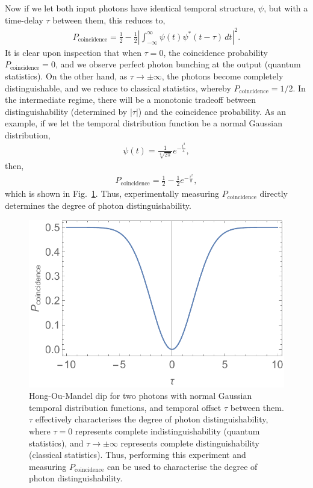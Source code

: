 \documentclass[aps,rmp,twocolumn,amsmath,amssymb,nofootinbib,superscriptaddress,longbibliography,floatfix,table-of-contents,eqsecnum]{revtex4-1}
\begin{document}
Now if we let both input photons have identical temporal structure, $\psi$, but with a time-delay $\tau$ between them, this reduces to,
\begin{align}
P_\text{coincidence} = \frac{1}{2} - \frac{1}{2} \left| \int^\infty_{-\infty} \psi(t)\psi^*(t-\tau)\,dt\right|^2.
\end{align}
It is clear upon inspection that when \mbox{$\tau=0$}, the coincidence probability \mbox{$P_\text{coincidence}=0$}, and we observe perfect photon bunching at the output (quantum statistics). On the other hand, as \mbox{$\tau\to\pm\infty$}, the photons become completely distinguishable, and we reduce to classical statistics, whereby \mbox{$P_\text{coincidence}=1/2$}. In the intermediate regime, there will be a monotonic tradeoff between distinguishability (determined by $|\tau|$) and the coincidence probability. As an example, if we let the temporal distribution function be a normal Gaussian distribution,
\begin{align}
\psi(t) = \frac{1}{\sqrt[4]{2\pi}}e^{-\frac{t^2}{4}},
\end{align}
then,
\begin{align}
P_\text{coincidence} = \frac{1}{2} - \frac{1}{2} e^{-\frac{\tau^2}{8}},
\end{align}
which is shown in Fig.~\ref{fig:HOM_dip}. Thus, experimentally measuring $P_\text{coincidence}$ directly determines the degree of photon distinguishability.

\begin{figure}[!htb]
\includegraphics[width=\columnwidth]{HOM_dip}
\caption{Hong-Ou-Mandel dip for two photons with normal Gaussian temporal distribution functions, and temporal offset $\tau$ between them. $\tau$ effectively characterises the degree of photon distinguishability, where \mbox{$\tau=0$} represents complete indistinguishability (quantum statistics), and \mbox{$\tau\to\pm\infty$} represents complete distinguishability (classical statistics). Thus, performing this experiment and measuring $P_\text{coincidence}$ can be used to characterise the degree of photon distinguishability.} \label{fig:HOM_dip}
\end{figure}
\end{document}
